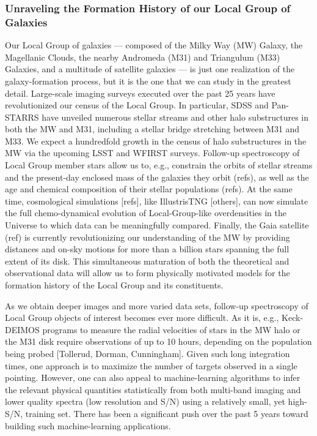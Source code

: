 \documentclass[oneside,11pt]{amsart}
\newcommand{\comment}[2][todo]{{\color{#1}[[{\bf #2}]]}}
\begin{document}
\subsubsection{Unraveling the Formation History of our Local Group of Galaxies}
\label{sec:localgroup}
\noindent \comment{1 page}

Our Local Group of galaxies --- composed of the Milky Way (MW) Galaxy,
the Magellanic Clouds, the nearby Andromeda (M31) and Triangulum (M33)
Galaxies, and a multitude of satellite galaxies --- is just one
realization of the galaxy-formation process, but it is the one that we
can study in the greatest detail.  Large-scale imaging surveys executed
over the past 25 years have revolutionized our census of the Local
Group.  In particular, SDSS and Pan-STARRS have unveiled numerous
stellar streams and other halo substructures in both the MW and M31,
including a stellar bridge stretching between M31 and M33.  We expect a
hundredfold growth in the census of halo substructures in the MW via the
upcoming LSST and WFIRST surveys.  Follow-up spectroscopy of Local Group
member stars allow us to, e.g., constrain the orbits of stellar streams
and the present-day enclosed mass of the galaxies they orbit (refs), as
well as the age and chemical composition of their stellar populations
(refs).  At the same time, cosmological simulations [refs], like
IllustrisTNG [others], can now simulate the full chemo-dynamical
evolution of Local-Group-like overdensities in the Universe to which
data can be meaningfully compared.  Finally, the Gaia satellite (ref) is
currently revolutionizing our understanding of the MW by providing
distances and on-sky motions for more than a billion stars spanning the
full extent of its disk.  This simultaneous maturation of both the
theoretical and observational data will allow us to form physically
motivated models for the formation history of the Local Group and its
constituents.

As we obtain deeper images and more varied data sets, follow-up
spectroscopy of Local Group objects of interest becomes ever more
difficult.  As it is, e.g., Keck-DEIMOS programs to measure the radial
velocities of stars in the MW halo or the M31 disk require observations
of up to 10 hours, depending on the population being probed [Tollerud,
Dorman, Cunningham].  Given such long integration times, one approach is
to maximize the number of targets observed in a single pointing.
However, one can also appeal to machine-learning algorithms to infer the
relevant physical quantities statistically from both multi-band imaging
and lower quality spectra (low resolution and S/N) using a relatively
small, yet high-S/N, training set.  There has been a significant push
over the past 5 years toward building such machine-learning
applications.
\end{document}
